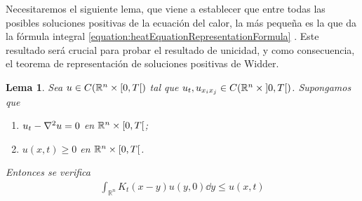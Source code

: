 \documentclass{article}
\newcommand{\realNumbers}{\mathbb{R}}
\newtheorem{lemma}{Lema}
\theoremstyle{definition}
\theoremstyle{remark}
\newcommand{\leftOpenInterval}{\left]}
\newcommand{\rightOpenInterval}{\right[}
\newcommand{\leftClosedInterval}{\left[}
\newcommand{\rightClosedInterval}{\right]}
\newcommand{\interval}[3]{%
  \ifstrequal{#1}{oo}{%
    \leftOpenInterval #2, #3 \rightOpenInterval%
  }{%
    \ifstrequal{#1}{co}{%
      \leftClosedInterval #2, #3 \rightOpenInterval%
    }{%
      \ifstrequal{#1}{oc}{
        \leftOpenInterval #2, #3 \rightClosedInterval%
      }{%
        \ifstrequal{#1}{cc}{
          \leftClosedInterval #2, #3 \rightClosedInterval
        }{%
        }%
      }%
    }%
  }%
}
\begin{document}
  Necesitaremos el siguiente lema, que viene a establecer que entre todas las posibles soluciones positivas de la ecuación del calor, la más pequeña es la que da la fórmula integral
  \ref{equation:heatEquationRepresentationFormula}  %
  .
  Este resultado será crucial para probar el resultado de unicidad, y como consecuencia, el teorema de representación de soluciones positivas de Widder.

  \begin{lemma} %
    Sea \(u \in C(\realNumbers^n \times \interval{co}{0}{T})\) tal que \(u_t, u_{x_i x_j} \in C(\realNumbers^n \times \interval{oo}{0}{T})\).
    Supongamos que
    \begin{enumerate}
      \item \(u_t - \laplacian u = 0\) en \(\realNumbers^n \times \interval{co}{0}{T}\);
      \item \(u(x, t) \geq 0\) en \(\realNumbers^n \times \interval{co}{0}{T}\). 
    \end{enumerate}
    Entonces se verifica
    \begin{align}
      \label{inequality:Kt-u-convolutionInequality}
      \int_{\realNumbers^n} K_t(x - y) u(y, 0) \dd y
      \leq
      u(x, t)
    \end{align}
  \end{lemma}
\end{document}
